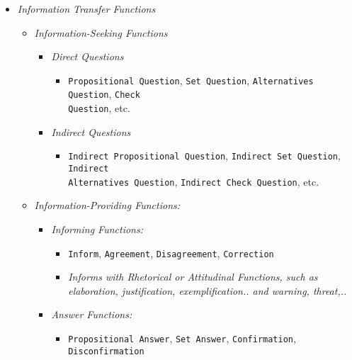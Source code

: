 \documentclass[10pt,a4paper,twoside]{article}
\begin{document}
\begin{itemize}
	\item \textit{Information Transfer Functions}
	\begin{itemize}
		\item \textit{Information-Seeking Functions}
			\begin{itemize}
				\item \textit{Direct Questions}
				\begin{itemize}
					\item \texttt{Propositional Question}, \texttt{Set Question}, \texttt{Alternatives Question}, \texttt{Check\\ Question}, etc.
				\end{itemize}
				\item \textit{Indirect Questions}
				\begin{itemize}
					\item \texttt{Indirect Propositional Question}, \texttt{Indirect Set Question}, \texttt{Indirect\\ Alternatives Question}, \texttt{Indirect Check Question}, etc.
				\end{itemize}
			\end{itemize}
		\item \textit{Information-Providing Functions:}
			\begin{itemize}
				\item \textit{Informing Functions:}
				\begin{itemize}
					\item \texttt{Inform}, \texttt{Agreement}, \texttt{Disagreement}, \texttt{Correction}
					\item \textit{Informs with Rhetorical or Attitudinal Functions, such as elaboration, justification, exemplification.. and warning, threat,..}
				\end{itemize}
				\item \textit{Answer Functions:}
				\begin{itemize}
					\item \texttt{Propositional Answer}, \texttt{Set Answer}, \texttt{Confirmation}, \texttt{Disconfirmation}
				\end{itemize}
			\end{itemize}


\end{itemize}
\end{itemize}
\end{document}
